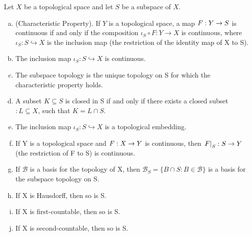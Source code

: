 \documentclass[11pt,a4paper]{article}
\begin{document}
\begin{proposition}
Let $X$ be a topological space and let $S$ be a subspace of $X$.
\begin{enumerate}[(a)]
    \item (Characteristic Property). If $Y$ is a topological space, a map $F:Y\rightarrow S$ is continuous if and only if the composition $\iota_S\circ F: Y\rightarrow X$ is continuous, where $\iota_S:S\hookrightarrow X$ is the inclusion map (the restriction of the identity map of X to S).
    \item The inclusion map $\iota_S:S\hookrightarrow X$ is continuous.
    \item The subspace topology is the unique topology on S for which the characteristic property holds.
    \item A subset $K\subseteq S$ is closed in S if and only if there exists a closed subset $:L\subseteq X$, such that $K=L\cap S$.
    \item The inclusion map $\iota_S:S\hookrightarrow X$ is a topological embedding.
    \item If Y is a topological space and $F:X\rightarrow Y$ is continuous, then $\left.F\right|_{S}:S\rightarrow Y$ (the restriction of F to S) is continuous.
    \item If $\mathcal{B}$ is a basis for the topology of X, then $\mathcal{B}_S = \{B\cap S: B\in\mathcal{B}\}$ is a basis for the subspace topology on S.
    \item If X is Hausdorff, then so is S.
    \item If X is first-countable, then so is S.
    \item If X is second-countable, then so is S. 
\end{enumerate}
\end{proposition}
\end{document}

